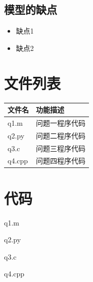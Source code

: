 \documentclass[withoutpreface,bwprint]{cumcmthesis}
\begin{document}
\subsection{模型的缺点}
\begin{itemize}[itemindent=2em]
\item 缺点1
\item 缺点2
\end{itemize}

\nocite{*}

\newpage
\begin{appendices}
\section{文件列表}
\begin{table}[H]
\centering
\begin{tabularx}{\textwidth}{LL}
\toprule
文件名   & 功能描述 \\
\midrule
q1.m & 问题一程序代码 \\
q2.py & 问题二程序代码 \\
q3.c & 问题三程序代码 \\
q4.cpp & 问题四程序代码 \\
\bottomrule
\end{tabularx}
\label{tab:文件列表}
\end{table}

\section{代码}
\noindent q1.m

q2.py

q3.c

q4.cpp

\end{appendices}
\end{document}

